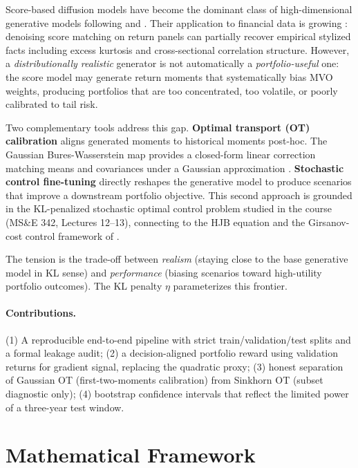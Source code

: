 \documentclass{article}
\begin{document}
Score-based diffusion models have become the dominant class of high-dimensional
generative models following \citet{ho2020denoising} and \citet{song2021score}.
Their application to financial data is growing \citep{lim2023generating,
vuletich2024generative}: denoising score matching on return panels can partially
recover empirical stylized facts including excess kurtosis and cross-sectional
correlation structure. However, a \emph{distributionally realistic} generator is
not automatically a \emph{portfolio-useful} one: the score model may generate return
moments that systematically bias MVO weights, producing portfolios that are too
concentrated, too volatile, or poorly calibrated to tail risk.

Two complementary tools address this gap.
\textbf{Optimal transport (OT) calibration} aligns generated moments to historical
moments post-hoc. The Gaussian Bures-Wasserstein map provides a closed-form linear
correction matching means and covariances under a Gaussian approximation
\citep{bures1969extension, brenier1991polar}.
\textbf{Stochastic control fine-tuning} directly reshapes the generative model to
produce scenarios that improve a downstream portfolio objective. This second
approach is grounded in the KL-penalized stochastic optimal control problem studied
in the course (MS\&E 342, Lectures 12--13), connecting to the HJB equation and the
Girsanov-cost control framework of \citet{han2025score}.

The tension is the trade-off between \emph{realism} (staying close to the base
generative model in KL sense) and \emph{performance} (biasing scenarios toward
high-utility portfolio outcomes). The KL penalty $\eta$ parameterizes this frontier.

\paragraph{Contributions.}
(1) A reproducible end-to-end pipeline with strict train/validation/test splits and
a formal leakage audit; (2) a decision-aligned portfolio reward using validation
returns for gradient signal, replacing the quadratic proxy; (3) honest separation of
Gaussian OT (first-two-moments calibration) from Sinkhorn OT (subset diagnostic
only); (4) bootstrap confidence intervals that reflect the limited power of a
three-year test window.

\section{Mathematical Framework}
\label{sec:math}
\end{document}

